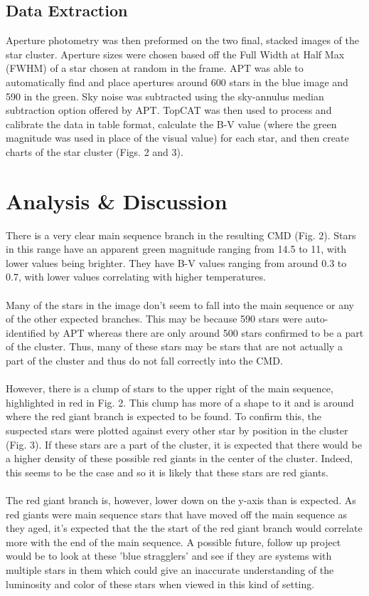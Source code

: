 \documentclass[12pt]{article}
\begin{document}
		\subsection{Data Extraction}
			Aperture photometry was then preformed on the two final, stacked images of the star cluster. Aperture sizes were chosen based off the Full Width at Half Max (FWHM) of a star chosen at random in the frame. APT was able to automatically find and place apertures around 600 stars in the blue image and 590 in the green. Sky noise was subtracted using the sky-annulus median subtraction option offered by APT. TopCAT was then used to process and calibrate the data in table format, calculate the B-V value (where the green magnitude was used in place of the visual value) for each star, and then create charts of the star cluster (Figs. 2 and 3).
	
	\section{Analysis \& Discussion}
		There is a very clear main sequence branch in the resulting CMD (Fig. 2). Stars in this range have an apparent green magnitude ranging from 14.5 to 11, with lower values being brighter. They have B-V values ranging from around 0.3 to 0.7, with lower values correlating with higher temperatures.
		\\\\
		Many of the stars in the image don't seem to fall into the main sequence or any of the other expected branches. This may be because 590 stars were auto-identified by APT whereas there are only around 500 stars confirmed to be a part of the cluster. Thus, many of these stars may be stars that are not actually a part of the cluster and thus do not fall correctly into the CMD.
		\\\\
		However, there is a clump of stars to the upper right of the main sequence, highlighted in red in Fig. 2. This clump has more of a  shape to it and is around where the red giant branch is expected to be found. To confirm this, the suspected stars were plotted against every other star by position in the cluster (Fig. 3). If these stars are a part of the cluster, it is expected that there would be a higher density of these possible red giants in the center of the cluster. Indeed, this seems to be the case and so it is likely that these stars are red giants.
		\\\\
		The red giant branch is, however, lower down on the y-axis than is expected. As red giants were main sequence stars that have moved off the main sequence as they aged, it's expected that the the start of the red giant branch would correlate more with the end of the main sequence. A possible future, follow up project would be to look at these 'blue stragglers' and see if they are systems with multiple stars in them which could give an inaccurate understanding of the luminosity and color of these stars when viewed in this kind of setting.
		
\end{document}
